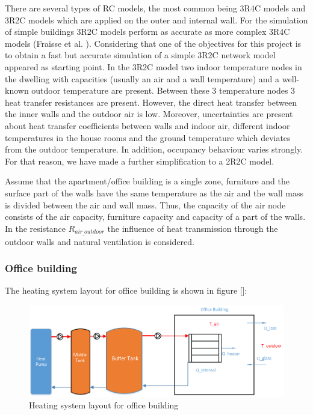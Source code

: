 \documentclass[a4paper,10pt]{article}
\begin{document}
There are several types of RC models, the most common being 3R4C models and 3R2C models which are applied on the outer and internal wall. For the simulation of simple buildings 3R2C models perform as accurate as more complex 3R4C models (Fraisse et al. ). Considering that one of the objectives for this project is to obtain a fast but accurate simulation of a simple 3R2C network model appeared as starting point. In the 3R2C model two indoor temperature nodes in the dwelling with capacities (usually an air and a wall temperature) and a well-known outdoor temperature are present. Between these 3 temperature nodes 3 heat transfer resistances are present. However, the direct heat transfer between the inner walls and the outdoor air is low. Moreover, uncertainties are present about heat transfer coefficients between walls and indoor air, different indoor temperatures in the house rooms and the ground temperature which deviates from the outdoor temperature. In addition, occupancy behaviour varies strongly. For that reason, we have made a further simplification to a 2R2C model. 

Assume that the apartment/office building is a single zone, furniture and the surface part of the walls have the same temperature as the air and the wall mass is divided between the air and wall mass. Thus, the capacity of the air node consists of the air capacity, furniture capacity and capacity of a part of the walls. In the resistance $R_{air_{\_}outdoor}$ the influence of heat transmission through the outdoor walls and natural ventilation is considered. 

\subsubsection{Office building}

The heating system layout for office building is shown in figure []:

\begin{figure}[ht]
\centering
\includegraphics[width=1\columnwidth]{pictures/Office_diagram.png}
\caption[Short title]{Heating system layout for office building}
\label{fig:ff2}\end{figure}
\end{document}
